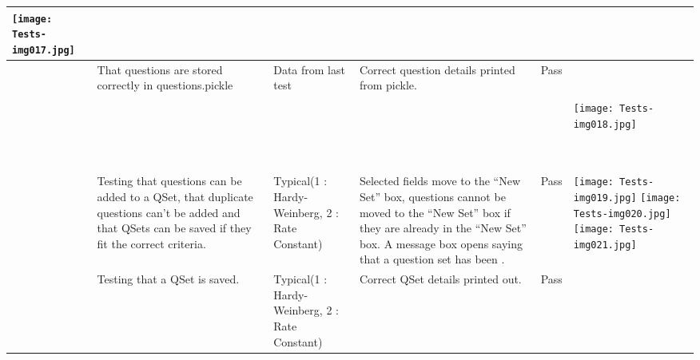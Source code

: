 \documentclass[a4paper,landscape,10pt]{article}
\begin{document}
\begin{flushleft}
\begin{supertabular}{|m{1.1899999cm}|m{2.294cm}|m{2.294cm}|m{3cm}|m{1.305cm}|m{15.190001cm}|}
{\fontsize{11pt}{13.2pt}\selectfont   \texttt{[image: Tests-img017.jpg]}
 }\\\hline
{\fontsize{11pt}{13.2pt}} &
{\fontsize{11pt}{13.2pt}\selectfont That questions are stored correctly in questions.pickle} &
{\fontsize{11pt}{13.2pt}\selectfont Data from last test} &
{\fontsize{11pt}{13.2pt}\selectfont Correct question details printed from pickle.} &
{\fontsize{11pt}{13.2pt}\selectfont Pass} &
{\fontsize{11pt}{13.2pt}\selectfont ~}

{\fontsize{11pt}{13.2pt}\selectfont  \texttt{[image: Tests-img018.jpg]}
 }

{\fontsize{11pt}{13.2pt}\selectfont ~}\\\hline
{\fontsize{11pt}{13.2pt}} &
{\fontsize{11pt}{13.2pt}\selectfont Testing that questions can be added to a QSet, that duplicate questions can't be added and that QSets can be saved if they fit the correct criteria.} &
{\fontsize{11pt}{13.2pt}\selectfont Typical(1 : Hardy-Weinberg, 2 : Rate Constant)} &
{\fontsize{11pt}{13.2pt}\selectfont Selected fields move to the ``New Set'' box, questions cannot be moved to the ``New Set'' box if they are already in the ``New Set'' box. A message box opens saying that a question set has been .} &
{\fontsize{11pt}{13.2pt}\selectfont Pass} &
{\fontsize{11pt}{13.2pt}\selectfont   \texttt{[image: Tests-img019.jpg]}
  \texttt{[image: Tests-img020.jpg]}
  \texttt{[image: Tests-img021.jpg]}
 }\\\hline
{\fontsize{11pt}{13.2pt}} &
{\fontsize{11pt}{13.2pt}\selectfont Testing that a QSet is saved.} &
{\fontsize{11pt}{13.2pt}\selectfont Typical(1 : Hardy-Weinberg, 2 : Rate Constant)} &
{\fontsize{11pt}{13.2pt}\selectfont Correct QSet details printed out.} &
{\fontsize{11pt}{13.2pt}\selectfont Pass} &
{\fontsize{11pt}{13.2pt}\selectfont ~}


\end{supertabular}
\end{flushleft}
\end{document}
